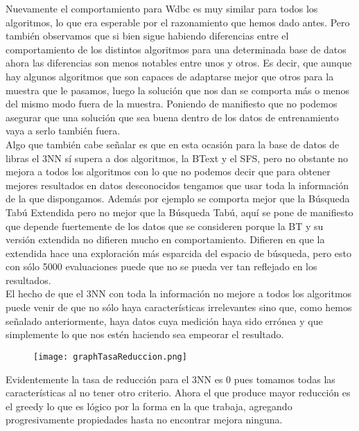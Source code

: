 \documentclass[10pt,a4paper]{article}
\begin{document}
Nuevamente el comportamiento para Wdbc es muy similar para todos los algoritmos, lo que era esperable por el razonamiento que hemos dado antes. Pero también observamos que si bien sigue habiendo diferencias entre el comportamiento de los distintos algoritmos para una determinada base de datos ahora las diferencias son menos notables entre unos y otros. Es decir, que aunque hay algunos algoritmos que son capaces de adaptarse mejor que otros para la muestra que le pasamos, luego la solución que nos dan se comporta más o menos del mismo modo fuera de la muestra. Poniendo de manifiesto que no podemos asegurar que una solución que sea buena dentro de los datos de entrenamiento vaya a serlo también fuera.\\

Algo que también cabe señalar es que en esta ocasión para la base de datos de libras el 3NN sí supera a dos algoritmos, la BText y el SFS, pero no obstante no mejora a todos los algoritmos con lo que no podemos decir que para obtener mejores resultados en datos desconocidos tengamos que usar toda la información de la que dispongamos. Además por ejemplo se comporta mejor que la Búsqueda Tabú Extendida pero no mejor que la Búsqueda Tabú, aquí se pone de manifiesto que depende fuertemente de los datos que se consideren porque la BT y su versión extendida no difieren mucho en comportamiento. Difieren en que la extendida hace una exploración más esparcida del espacio de búsqueda, pero esto con sólo 5000 evaluaciones puede que no se pueda ver tan reflejado en los resultados.\\

El hecho de que el 3NN con toda la información no mejore a todos los algoritmos puede venir de que no sólo haya características irrelevantes sino que, como hemos señalado anteriormente, haya datos cuya medición haya sido errónea y que simplemente lo que nos estén haciendo sea empeorar el resultado.\\

\begin{figure}[H]
\centering
\texttt{[image: graphTasaReduccion.png]}
\end{figure}

Evidentemente la tasa de reducción para el 3NN es 0 pues tomamos todas las características al no tener otro criterio. Ahora el que produce mayor reducción es el greedy lo que es lógico por la forma en la que trabaja, agregando progresivamente propiedades hasta no encontrar mejora ninguna.\\
\end{document}
